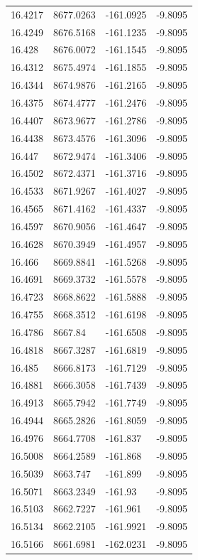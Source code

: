 \begin{table}[H]
\begin{tabular}{llll}
16.4217 & 8677.0263 & -161.0925 & -9.8095 \\
16.4249 & 8676.5168 & -161.1235 & -9.8095 \\
16.428 & 8676.0072 & -161.1545 & -9.8095 \\
16.4312 & 8675.4974 & -161.1855 & -9.8095 \\
16.4344 & 8674.9876 & -161.2165 & -9.8095 \\
16.4375 & 8674.4777 & -161.2476 & -9.8095 \\
16.4407 & 8673.9677 & -161.2786 & -9.8095 \\
16.4438 & 8673.4576 & -161.3096 & -9.8095 \\
16.447 & 8672.9474 & -161.3406 & -9.8095 \\
16.4502 & 8672.4371 & -161.3716 & -9.8095 \\
16.4533 & 8671.9267 & -161.4027 & -9.8095 \\
16.4565 & 8671.4162 & -161.4337 & -9.8095 \\
16.4597 & 8670.9056 & -161.4647 & -9.8095 \\
16.4628 & 8670.3949 & -161.4957 & -9.8095 \\
16.466 & 8669.8841 & -161.5268 & -9.8095 \\
16.4691 & 8669.3732 & -161.5578 & -9.8095 \\
16.4723 & 8668.8622 & -161.5888 & -9.8095 \\
16.4755 & 8668.3512 & -161.6198 & -9.8095 \\
16.4786 & 8667.84 & -161.6508 & -9.8095 \\
16.4818 & 8667.3287 & -161.6819 & -9.8095 \\
16.485 & 8666.8173 & -161.7129 & -9.8095 \\
16.4881 & 8666.3058 & -161.7439 & -9.8095 \\
16.4913 & 8665.7942 & -161.7749 & -9.8095 \\
16.4944 & 8665.2826 & -161.8059 & -9.8095 \\
16.4976 & 8664.7708 & -161.837 & -9.8095 \\
16.5008 & 8664.2589 & -161.868 & -9.8095 \\
16.5039 & 8663.747 & -161.899 & -9.8095 \\
16.5071 & 8663.2349 & -161.93 & -9.8095 \\
16.5103 & 8662.7227 & -161.961 & -9.8095 \\
16.5134 & 8662.2105 & -161.9921 & -9.8095 \\
16.5166 & 8661.6981 & -162.0231 & -9.8095 \\

\end{tabular}
\end{table}
